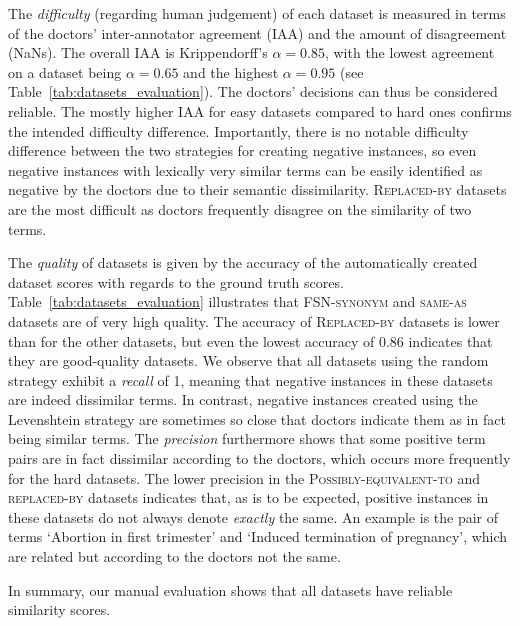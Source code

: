 \documentclass[letterpaper]{article} %
\newcommand{\lab}[1]{`#1'}
\newcommand{\dataset}[1]{\textsc{#1}}
\begin{document}
The \emph{difficulty} (regarding human judgement) of each dataset is measured in terms of the doctors' inter-annotator agreement (IAA) and the amount of disagreement (NaNs).
The overall IAA is Krippendorff's $\alpha = 0.85$,
with the lowest agreement on a dataset being $\alpha = 0.65$ and the highest $\alpha = 0.95$ (see Table~\ref{tab:datasets_evaluation}). The doctors' decisions can thus be considered reliable.
The mostly higher IAA for easy datasets compared to hard ones confirms the intended difficulty difference.
Importantly, there is no notable difficulty difference between the two strategies for creating negative instances, so even negative instances with lexically very similar terms can be easily identified as negative by the doctors due to their semantic dissimilarity.
\dataset{Replaced-by} datasets are the most difficult as doctors frequently disagree on the similarity of two terms.

The \emph{quality} of datasets is given by the accuracy of the automatically created dataset scores with regards to the ground truth scores.
Table~\ref{tab:datasets_evaluation} illustrates that \dataset{FSN-synonym} and \dataset{same-as} datasets are of very high quality.
The accuracy of
\dataset{Replaced-by} datasets is lower than for the other datasets, but even the lowest accuracy of 0.86 indicates that they are good-quality datasets.
We observe that all datasets using the random strategy exhibit a \emph{recall} of 1, meaning that negative instances in these datasets are indeed dissimilar terms.
In contrast, negative instances created using the Levenshtein strategy are sometimes so close that doctors indicate them as in fact being similar terms.
The \emph{precision} furthermore shows that some positive term pairs are in fact dissimilar according to the doctors, which
 occurs more frequently for the hard datasets.
The lower precision in the \dataset{Possibly-equivalent-to} and \dataset{replaced-by} datasets indicates that, as is to be expected, positive instances in these datasets do not always denote \emph{exactly} the same. An example is the pair of terms  \lab{Abortion in first trimester} and \lab{Induced termination of pregnancy}, which are related but according to the doctors not the same.

In summary, our manual evaluation shows that all datasets have reliable similarity scores.


\end{document}
